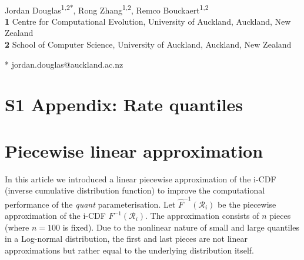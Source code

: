 \documentclass[12pt]{article}
\begin{document}
\vspace*{0.2in}

\begin{flushleft}
{\Large
\textbf{} %
}
\newline
\\
Jordan Douglas\textsuperscript{1,2*},
Rong Zhang\textsuperscript{1,2},
Remco Bouckaert\textsuperscript{1,2}
\\
\bigskip
\textbf{1} Centre for Computational Evolution,  University of Auckland, Auckland, New Zealand\\
\textbf{2} School of Computer Science, University of Auckland, Auckland, New Zealand\\
\bigskip


* jordan.douglas@auckland.ac.nz


\end{flushleft}




\section*{S1 Appendix: Rate quantiles}



\section{Piecewise linear approximation}

In this article we introduced a linear piecewise approximation of the i-CDF (inverse cumulative distribution function) to improve the computational performance of the \textit{quant} parameterisation. 
Let $\hat{F}^{-1}(\mathcal{R}_i)$ be the piecewise approximation of the i-CDF $F^{-1}(\mathcal{R}_i)$. 
The approximation consists of $n$ pieces (where $n=100$ is fixed).
Due to the nonlinear nature of small and large quantiles in a Log-normal distribution, the first and last pieces are not linear approximations but rather equal to the underlying distribution itself. 
\end{document}
